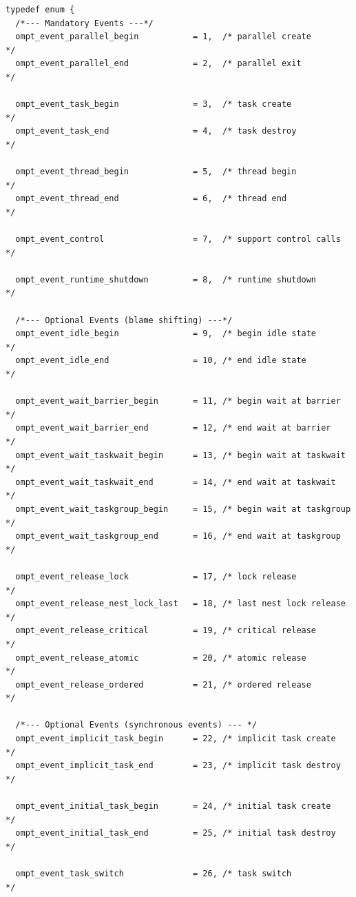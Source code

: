 \documentclass{article}
\begin{document}
\begin{verbatim}
typedef enum {  
  /*--- Mandatory Events ---*/          
  ompt_event_parallel_begin           = 1,  /* parallel create            */
  ompt_event_parallel_end             = 2,  /* parallel exit              */

  ompt_event_task_begin               = 3,  /* task create                */
  ompt_event_task_end                 = 4,  /* task destroy               */

  ompt_event_thread_begin             = 5,  /* thread begin               */
  ompt_event_thread_end               = 6,  /* thread end                 */

  ompt_event_control                  = 7,  /* support control calls      */

  ompt_event_runtime_shutdown         = 8,  /* runtime shutdown           */

  /*--- Optional Events (blame shifting) ---*/  		    
  ompt_event_idle_begin	              = 9,  /* begin idle state           */ 
  ompt_event_idle_end                 = 10, /* end idle state             */ 

  ompt_event_wait_barrier_begin       = 11, /* begin wait at barrier      */
  ompt_event_wait_barrier_end         = 12, /* end wait at barrier        */
  ompt_event_wait_taskwait_begin      = 13, /* begin wait at taskwait     */
  ompt_event_wait_taskwait_end        = 14, /* end wait at taskwait       */
  ompt_event_wait_taskgroup_begin     = 15, /* begin wait at taskgroup    */
  ompt_event_wait_taskgroup_end       = 16, /* end wait at taskgroup      */

  ompt_event_release_lock             = 17, /* lock release               */
  ompt_event_release_nest_lock_last   = 18, /* last nest lock release     */
  ompt_event_release_critical         = 19, /* critical release           */
  ompt_event_release_atomic           = 20, /* atomic release             */
  ompt_event_release_ordered          = 21, /* ordered release            */

  /*--- Optional Events (synchronous events) --- */        	    
  ompt_event_implicit_task_begin      = 22, /* implicit task create       */
  ompt_event_implicit_task_end        = 23, /* implicit task destroy      */
  
  ompt_event_initial_task_begin       = 24, /* initial task create        */
  ompt_event_initial_task_end         = 25, /* initial task destroy       */
				    
  ompt_event_task_switch              = 26, /* task switch                */
				    				    

\end{verbatim}
\end{document}
